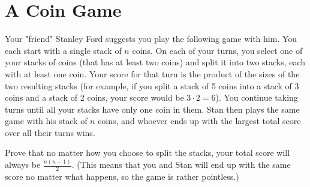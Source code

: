 \documentclass{article}
\begin{document}
\section{A Coin Game}
\begin{hw}
	Your "friend" Stanley Ford suggests you play the following game with him.  You each start with a single stack of $n$ coins.  On each of your turns, you select one of your stacks of coins (that has at least two coins) and split it into two stacks, each with at least one coin.  Your score for that turn is the product of the sizes of the two resulting stacks (for example, if you split a stack of 5 coins into a stack of 3 coins and a stack of 2 coins, your score would be $3 \cdot 2 = 6$).  You continue taking turns until all your stacks have only one coin in them.  Stan then plays the same game with his stack of $n$ coins, and whoever ends up with the largest total score over all their turns wins.
	
	Prove that no matter how you choose to split the stacks, your total score will always be $\frac{n(n - 1)}{2}$. (This means that you and Stan will end up with the same score no matter what happens, so the game is rather pointless.)
\end{hw}
\end{document}
